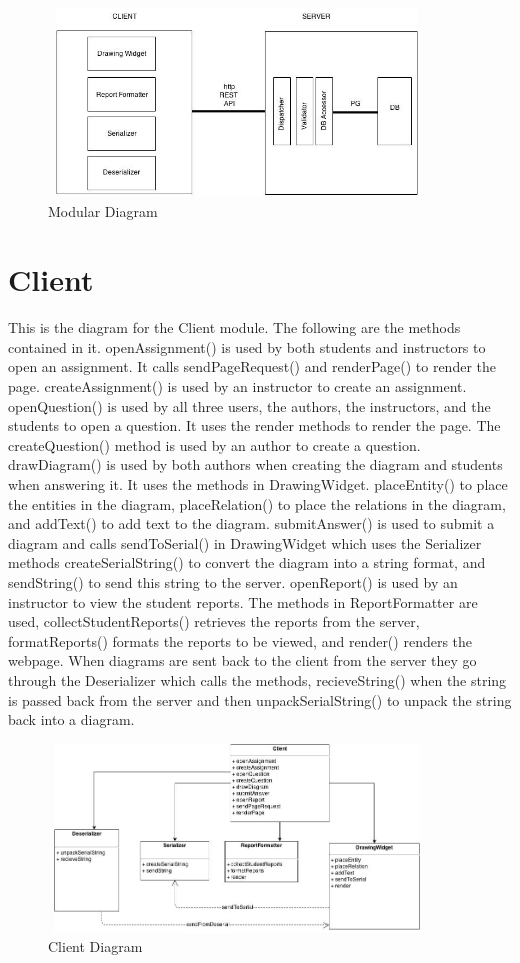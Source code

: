                        \begin{figure}[H]
            \centerline{\includegraphics[height=5cm, width=10cm]{Modular.jpg}}
            \caption{Modular Diagram}
    \end{figure}
    
    \chapter{Client}
This is the diagram for the Client module. The following are the methods contained in it. openAssignment() is used by both students and instructors to open an assignment. It calls sendPageRequest() and renderPage() to render the page. createAssignment() is used by an instructor to create an assignment. openQuestion() is used by all three users, the authors, the instructors, and the students to open a question. It uses the render methods to render the page. The createQuestion() method is used by an author to create a question. drawDiagram() is used by both authors when creating the diagram and students when answering it. It uses the methods in DrawingWidget. placeEntity() to place the entities in the diagram, placeRelation() to place the relations in the diagram, and addText() to add text to the diagram. submitAnswer() is used to submit a diagram and calls sendToSerial() in DrawingWidget which uses the Serializer methods createSerialString() to convert the diagram into a string format, and sendString() to send this string to the server. openReport() is used by an instructor to view the student reports. The methods in ReportFormatter are used, collectStudentReports() retrieves the reports from the server, formatReports() formats the reports to be viewed, and render() renders the webpage.  When diagrams are sent back to the client from the server they go through the Deserializer which calls the methods, recieveString() when the string is passed back from the server and then unpackSerialString() to unpack the string back into a diagram.
  
                        \begin{figure}[H]
            \centerline{\includegraphics[height=5cm, width=10cm]{Client.jpg}}
            \caption{Client Diagram}
    \end{figure}
    
